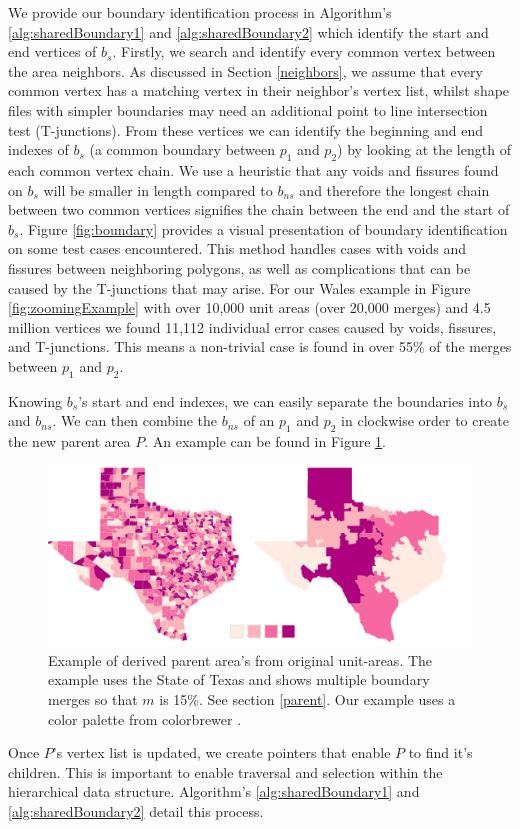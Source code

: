  We provide our boundary identification process in Algorithm's \ref{alg:sharedBoundary1} and \ref{alg:sharedBoundary2} which identify the start and end vertices of $b_{s}$. 
Firstly, we search and identify every common vertex between the area neighbors. As discussed in Section \ref{neighbors}, we assume that every common vertex has a matching vertex in their neighbor's vertex list, whilst shape files with simpler boundaries may need an additional point to line intersection test (T-junctions). From these vertices we can identify the beginning and end indexes of $b_{s}$ (a common boundary between $p_1$ and $p_2$) by looking at the length of each common vertex chain. We use a heuristic that any voids and fissures found on $b_{s}$ will be smaller in length compared to $b_{ns}$ and therefore the longest chain between two common vertices signifies the chain between the end and the start of $b_{s}$. Figure \ref{fig:boundary} provides a visual presentation of boundary identification on  some test cases encountered. This method handles cases with voids and fissures between neighboring polygons, as well as complications that can be caused by the T-junctions that may arise. For our Wales example in Figure \ref{fig:zoomingExample} with over 10,000 unit areas (over 20,000 merges) and 4.5 million vertices we found 11,112 individual error cases caused by voids, fissures, and T-junctions. This means a non-trivial case is found in over 55\% of the merges between $p_1$ and $p_2$.

Knowing $b_{s}$'s start and end indexes, we can easily separate the boundaries into $b_{s}$ and $b_{ns}$. We can then combine the $b_{ns}$ of an $p_1$ and $p_2$ in clockwise order to create the new parent area $P$. An example can be found in Figure \ref{fig:parent}.

\begin{figure}[t]
\centering
\includegraphics[width=0.7\linewidth]{images/TexasExample}
\caption{Example of derived parent area's from original unit-areas. The example uses the State of Texas and shows multiple boundary merges \cite{Texas} so that $m$ is 15\%.  See section \ref{parent}. Our example uses a color palette from colorbrewer \cite{colorbrewer}. } \label{fig:parent} 
\end{figure} 
 Once $P$'s vertex list is updated, we create pointers that enable $P$ to find it's children. This is important to enable traversal and selection within the hierarchical data structure. Algorithm's \ref{alg:sharedBoundary1} and \ref{alg:sharedBoundary2} detail this process.

